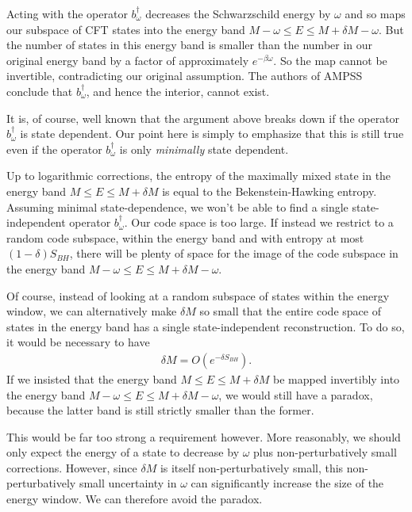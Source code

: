 \documentclass[12pt]{article}
\begin{document}
Acting with the operator $b_\omega^\dagger$ decreases the Schwarzschild energy by $\omega$ and so maps our subspace of CFT states into the energy band $M - \omega \leq E \leq M + \delta M - \omega$. But the number of states in this energy band is smaller than the number in our original energy band by a factor of approximately $e^{-\beta \omega}$. So the map cannot be invertible, contradicting our original assumption. The authors of AMPSS conclude that $b_\omega^\dagger$, and hence the interior, cannot exist.

It is, of course, well known that the argument above breaks down if the operator $b_\omega^\dagger$ is state dependent. Our point here is simply to emphasize that this is still true even if the operator $b_\omega^\dagger$ is only \emph{minimally} state dependent. 

Up to logarithmic corrections, the entropy of the maximally mixed state in the energy band $M \leq E \leq M + \delta M$ is equal to the Bekenstein-Hawking entropy. Assuming minimal state-dependence, we won't be able to find a single state-independent operator $b_\omega^\dagger$. Our code space is too large. If instead we restrict to a random code subspace, within the energy band and with entropy at most $(1-\delta)S_{BH}$, there will be plenty of space for the image of the code subspace in the energy band $M - \omega \leq E \leq M + \delta M - \omega$.

Of course, instead of looking at a random subspace of states within the energy window, we can alternatively make $\delta M$ so small that the entire code space of states in the energy band has a single state-independent reconstruction. To do so, it would be necessary to have 
\begin{align}
\delta M = O(e^{-\delta S_{BH}}).
\end{align}
If we insisted that the energy band $M \leq E \leq M + \delta M$ be mapped invertibly into the energy band $M - \omega \leq E \leq M + \delta M - \omega$, we would still have a paradox, because the latter band is still strictly smaller than the former. 

This would be far too strong a requirement however. More reasonably, we should only expect the energy of a state to decrease by $\omega$ plus non-perturbatively small corrections. However, since $\delta M$ is itself non-perturbatively small, this non-perturbatively small uncertainty in $\omega$ can significantly increase the size of the energy window. We can therefore avoid the paradox.
\end{document}

